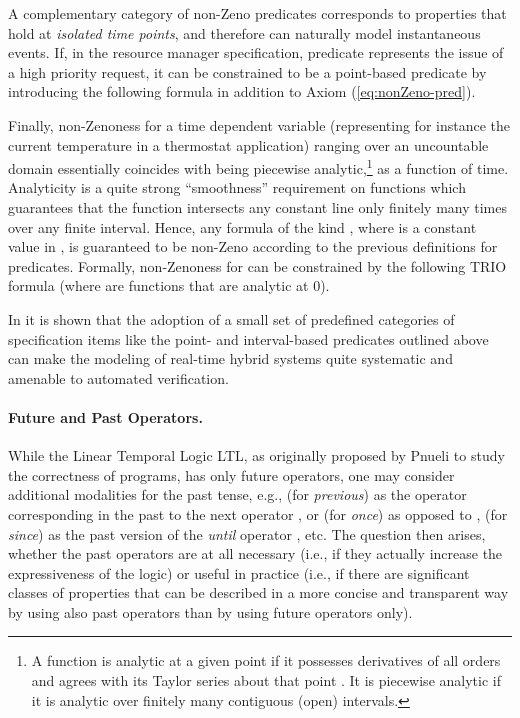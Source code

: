 A complementary category of non-Zeno predicates corresponds to 
properties that hold at \emph{isolated time points}, and therefore 
can naturally model instantaneous events. If, in the resource 
manager specification, predicate  represents the issue 
of a high priority request, it can be constrained to be a point-based 
predicate by introducing the following formula in addition to 
Axiom (\ref{eq:nonZeno-pred}). 


Finally, non-Zenoness for a time dependent variable  (representing
for instance the current temperature in a thermostat application)
ranging over an uncountable domain  essentially coincides with 
being piecewise analytic,\footnote{A function is analytic at a given
  point if it possesses derivatives of all orders and agrees with its
  Taylor series about that point \cite{WeiA,Kno96}. It is piecewise
  analytic if it is analytic over finitely many contiguous (open)
  intervals.} as a function of time. Analyticity is a quite strong
``smoothness'' requirement on functions which guarantees that the
function intersects any constant line only finitely many times over
any finite interval. Hence, any formula of the kind ,
where  is a constant value in , is guaranteed to be
non-Zeno according to the previous definitions for
predicates. Formally, non-Zenoness for  can be constrained by the
following TRIO formula (where  are functions
that are analytic at 0).
 

In \cite{GM06} it is shown that the adoption of a small set of predefined 
categories of specification items like the point- and interval-based 
predicates outlined above can make the modeling of real-time 
hybrid systems quite systematic and amenable to automated verification.


\paragraph{Future and Past Operators.}
While the Linear Temporal Logic LTL, as originally proposed by 
Pnueli \cite{Pnu77} to study the correctness of programs, has only 
future operators, one may consider additional modalities for the 
past tense, e.g.,  (for \emph{previous}) as the operator corresponding 
in the past to the next operator , or  (for \emph{once}) 
as opposed to ,  (for \emph{since}) as the past version 
of the \emph{until} operator , etc. The question then arises, 
whether the past operators are at all necessary (i.e., if they 
actually increase the expressiveness of the logic) or useful 
in practice (i.e., if there are significant classes of properties 
that can be described in a more concise and transparent way by 
using also past operators than by using future operators only).

